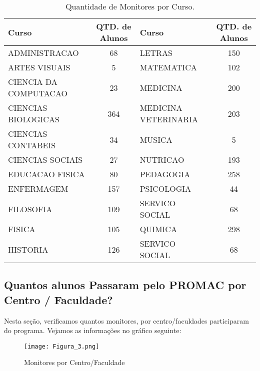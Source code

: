 \documentclass[12pt,a4paper]{article}
\begin{document}
			\begin{table}[!htb]
        	\begin{center}
            	\begin{tabular}{|p{4cm}|c|p{4cm}|c|}
                	\hline
                    Curso & QTD. de Alunos & Curso & QTD. de Alunos\\ \hline
                    ADMINISTRACAO & 68 &  LETRAS & 150 \\ \hline
                    ARTES VISUAIS & 5 & MATEMATICA & 102 \\ \hline
                    CIENCIA DA COMPUTACAO & 23 & MEDICINA & 200 \\ \hline
                    CIENCIAS BIOLOGICAS & 364 & MEDICINA VETERINARIA & 203 \\ \hline
                    CIENCIAS CONTABEIS & 34 & MUSICA & 5 \\ \hline
                    CIENCIAS SOCIAIS & 27 & NUTRICAO & 193 \\ \hline
                    EDUCACAO FISICA & 80 & PEDAGOGIA & 258 \\ \hline
                    ENFERMAGEM & 157 & PSICOLOGIA & 44 \\ \hline
                    FILOSOFIA & 109 & SERVICO SOCIAL & 68 \\ \hline 
                    FISICA & 105 & QUIMICA & 298 \\ \hline
                    HISTORIA & 126 & SERVICO SOCIAL &68 \\ 
                    \hline
            	\end{tabular}
            	\caption{Quantidade de Monitores por Curso.}
            	\label{Tabela3}
        	\end{center}
    		\end{table}
    		
    	\pagebreak

		\subsection{Quantos alunos Passaram pelo PROMAC por Centro / Faculdade?}
		
		Nesta seção, verificamos quantos monitores, por centro/faculdades participaram do programa. Vejamos as informações no 		gráfico seguinte:
			
			\begin{figure}[htb]
        		\centering
        		\texttt{[image: Figura\_3.png]}
        		\caption{Monitores por Centro/Faculdade}
        		\label{Monitores-Centro/Faculdade}
    		\end{figure}
    		
\end{document}
